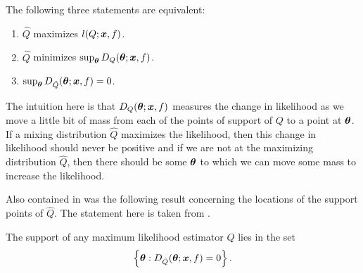 	\begin{theorem}
	\label{thm:Lindsay three statements that characterise maximizing mixture}
		The following three statements are equivalent:
		\begin{enumerate}
			\item $\hat{Q}$ maximizes $l(Q;{\bm{{x}}},f)$.
			\item $\hat{Q}$ minimizes $\sup_{\bm{{\theta}}} D_Q({\bm{{\theta}}};{\bm{{x}}}, f)$.
			\item $\sup_{\bm{{\theta}}} D_{\hat{Q}}({\bm{{\theta}}};{\bm{{x}}}, f) = 0$.
			\label{item:supremum of gradient is zero}
		\end{enumerate}
	\end{theorem}

	The intuition here is that $D_Q({\bm{{\theta}}}; {\bm{{x}}}, f)$ measures the change in likelihood as we move a little bit of mass from each of the points of support of $Q$ to a point at ${\bm{{\theta}}}$. If a mixing distribution $\hat{Q}$ maximizes the likelihood, then this change in likelihood should never be positive and if we are not at the maximizing distribution $\hat{Q}$, then there should be some ${\bm{{\theta}}}$ to which we can move some mass to increase the likelihood.


	Also contained in \cite[Theorem 4.1]{Lindsay1983-tf} was the following result concerning the locations of the support points of $\hat{Q}$. The statement here is taken from \cite[Theorem 20]{Lindsay1995-sq}.

	\begin{theorem}
		\label{thm: Lindsay support is zeros of gradient}
		The support of any maximum likelihood estimator $\hat{Q}$ lies in the set 
		\begin{equation}
			\left\{{\bm{{\theta}}} : D_{\hat{Q}}({\bm{{\theta}}};{\bm{{x}}},f) = 0 \right\}.
			\label{eq:set D_Q = 0}
		\end{equation}
	\end{theorem}

